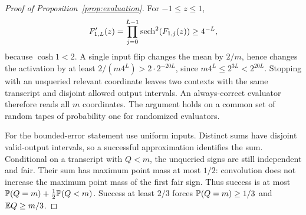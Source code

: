 \begin{proof}[Proof of Proposition~\ref{prop:evaluation}]
For \(-1\le z\le1\),
\[
F_{1,L}'(z)=\prod_{j=0}^{L-1}\operatorname{sech}^2(F_{1,j}(z))
\ge4^{-L},
\]
because \(\cosh1<2\).
A single input flip changes the mean by \(2/m\), hence changes the
activation by at least \(2/(m4^L)>2\cdot2^{-20L}\), since
\(m4^L\le2^{3L}<2^{20L}\).
Stopping with an unqueried relevant coordinate leaves two contexts
with the same transcript and disjoint allowed output intervals.
An always-correct evaluator therefore reads all \(m\) coordinates.
The argument holds on a common set of random tapes of probability
one for randomized evaluators.

For the bounded-error statement use uniform inputs.
Distinct sums have disjoint valid-output intervals, so a successful
approximation identifies the sum.
Conditional on a transcript with \(Q<m\), the unqueried signs are
still independent and fair. Their sum has maximum point mass at
most \(1/2\): convolution does not increase the maximum point mass
of the first fair sign.
Thus success is at most
\(\mathbb P(Q=m)+\frac12\mathbb P(Q<m)\).
Success at least \(2/3\) forces \(\mathbb P(Q=m)\ge1/3\) and
\(\mathbb E Q\ge m/3\).
\end{proof}
